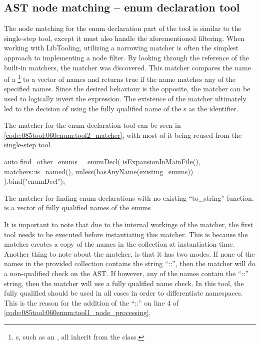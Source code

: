 \pagebreak
\subsection{AST node matching -- enum declaration tool}\label{subsubsec:080dev:085examples:060enum:matching_second_tool}
The node matching for the enum declaration part of the tool is similar to the single-step tool, except it must also handle the aforementioned filtering.
When working with LibTooling, utilizing a narrowing matcher is often the simplest approach to implementing a node filter.
By looking through the reference of the built-in matchers, the   matcher was discovered.
This matcher compares the name of a \footnote{s, such as an , all inherit from the  class.} to a vector of names and returns true if the name matches any of the specified names.
Since the desired behaviour is the opposite, the  matcher can be used to logically invert the expression.
The existence of the  matcher ultimately led to the decision of using the fully qualified name of the s as the identifier.

The matcher for the enum declaration tool can be seen in \cref{code:085tool:060enum:tool2_matcher}, with most of it being reused from the single-step tool.

\begin{listing}[H]
  \begin{cppcode}
auto find_other_enums = enumDecl(
    isExpansionInMainFile(),
    matchers::is_named(),
    unless(hasAnyName(existing_enums))
  ).bind("enumDecl");
  \end{cppcode}
  \caption{The matcher for finding enum declarations with no existing ``to\_string'' function.  is a vector of fully qualified names of the enums }
  \label{code:085tool:060enum:tool2_matcher}
\end{listing}

It is important to note that due to the internal workings of the  matcher, the first tool needs to be executed before instantiating this matcher.
This is because the  matcher creates a copy of the names in the collection at instantiation time.
Another thing to note about the  matcher, is that it has two modes.
If none of the names in the provided collection contains the string ``::'', then the matcher will do a non-qualified check on the AST. If however, any of the names contain the ``::'' string, then the matcher will use a fully qualified name check. In this tool, the fully qualified should be used in all cases in order to differentiate namespaces. 
This is the reason for the addition of the ``::'' on line 4 of \cref{code:085tool:060enum:tool1_node_processing}.

